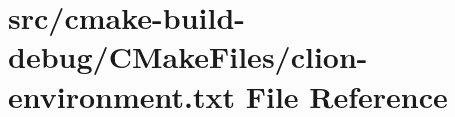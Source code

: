 \hypertarget{cmake-build-debug_2CMakeFiles_2clion-environment_8txt}{}\section{src/cmake-\/build-\/debug/\+C\+Make\+Files/clion-\/environment.txt File Reference}
\label{cmake-build-debug_2CMakeFiles_2clion-environment_8txt}
